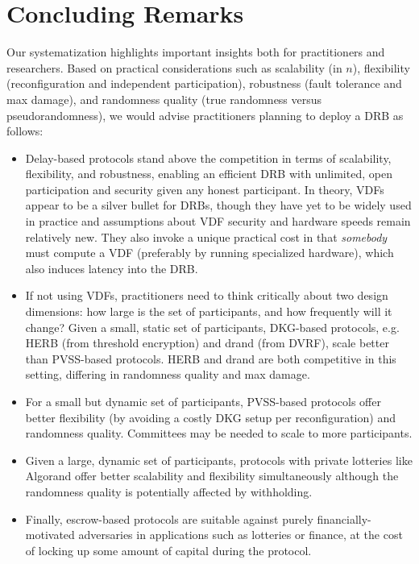 
\section{Concluding Remarks}
\label{section:conclusion}
Our systematization highlights important insights both for practitioners and researchers. Based on practical considerations such as scalability (in $n$), flexibility (reconfiguration and independent participation), robustness (fault tolerance and max damage), and randomness quality (true randomness versus pseudorandomness), we would advise practitioners planning to deploy a DRB as follows:
\begin{itemize}
    \item Delay-based protocols stand above the competition in terms of scalability, flexibility, and robustness, enabling an efficient DRB with unlimited, open participation and security given any honest participant. In theory, VDFs appear to be a silver bullet for DRBs, though they have yet to be widely used in practice and assumptions about VDF security and hardware speeds remain relatively new. They also invoke a unique practical cost in that \emph{somebody} must compute a VDF (preferably by running specialized hardware), which also induces latency into the DRB.
    \item If not using VDFs, practitioners need to think critically about two design dimensions: how large is the set of participants, and how frequently will it change? Given a small, static set of participants, DKG-based protocols, e.g. HERB (from threshold encryption) and drand (from DVRF), scale better than PVSS-based protocols. HERB and drand are both competitive in this setting, differing in randomness quality and max damage.
    \item For a small but dynamic set of participants, PVSS-based protocols offer better flexibility (by avoiding a costly DKG setup per reconfiguration) and randomness quality. Committees may be needed to scale to more participants.
    \item Given a large, dynamic set of participants, protocols with private lotteries like Algorand offer better scalability and flexibility simultaneously although the randomness quality is potentially affected by withholding.
    \item Finally, escrow-based protocols are suitable against purely financially-motivated adversaries in applications such as lotteries or finance, at the cost of locking up some amount of capital during the protocol.
\end{itemize}


